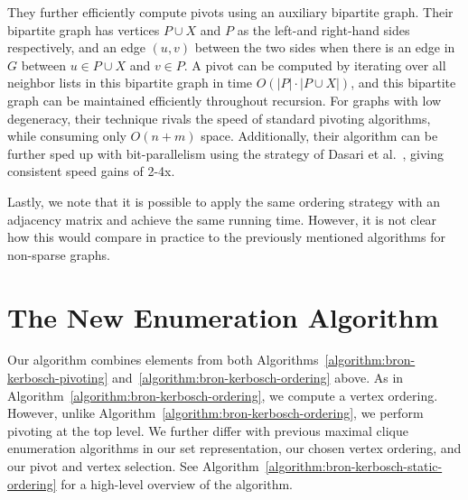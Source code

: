 \documentclass[final,1p]{elsarticle-modified}
\begin{document}
They further efficiently compute pivots using an auxiliary bipartite graph. Their bipartite graph has vertices $P\cup X$ and $P$ as the left-and right-hand sides respectively, and an edge $(u,v)$ between the two sides when there is an edge in $G$ between $u\in P\cup X$ and $v\in P$. A pivot can be computed by iterating over all neighbor lists in this bipartite graph in time $O(|P|\cdot|P\cup X|)$, and this bipartite graph can be maintained efficiently throughout recursion. For graphs with low degeneracy, their technique rivals the speed of standard pivoting algorithms, while consuming only $O(n+m)$ space. Additionally, their algorithm can be further sped up with bit-parallelism using the strategy of Dasari et al.~\cite{dasari-2014}, giving consistent speed gains of 2-4x.


Lastly, we note that it is possible to apply the same ordering strategy with an adjacency matrix and achieve the same running time. However, it is not clear how this would compare in practice to the previously mentioned algorithms for non-sparse graphs.

\section{The New Enumeration Algorithm}
\label{section:new-algorithm}
Our algorithm combines elements from both Algorithms~\ref{algorithm:bron-kerbosch-pivoting} and~\ref{algorithm:bron-kerbosch-ordering} above. As in Algorithm~\ref{algorithm:bron-kerbosch-ordering}, we compute a vertex ordering. However, unlike Algorithm~\ref{algorithm:bron-kerbosch-ordering}, we perform pivoting at the top level. We further differ with previous maximal clique enumeration algorithms in our set representation, our chosen vertex ordering, and our pivot and vertex selection. See Algorithm~\ref{algorithm:bron-kerbosch-static-ordering} for a high-level overview of the algorithm.
\end{document}
